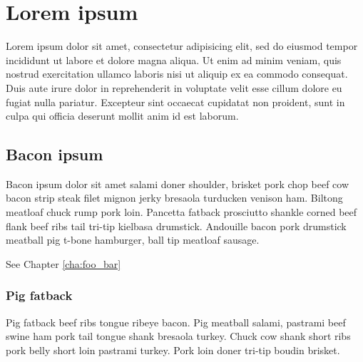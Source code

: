\chapter{Lorem ipsum}
\label{cha:lorem_ipsum}

Lorem ipsum dolor sit amet, consectetur adipisicing elit, sed do eiusmod
tempor incididunt ut labore et dolore magna aliqua. Ut enim ad minim veniam,
quis nostrud exercitation ullamco laboris nisi ut aliquip ex ea commodo
consequat. Duis aute irure dolor in reprehenderit in voluptate velit esse
cillum dolore eu fugiat nulla pariatur. Excepteur sint occaecat cupidatat non
proident, sunt in culpa qui officia deserunt mollit anim id est laborum.

\section{Bacon ipsum}
\label{sec:bacon_ipsum}

Bacon ipsum dolor sit amet salami doner shoulder, brisket pork chop beef cow bacon strip steak filet mignon jerky bresaola turducken venison ham. Biltong meatloaf chuck rump pork loin. Pancetta fatback prosciutto shankle corned beef flank beef ribs tail tri-tip kielbasa drumstick. Andouille bacon pork drumstick meatball pig t-bone hamburger, ball tip meatloaf sausage.

See Chapter \ref{cha:foo_bar}

\subsection{Pig fatback}
\label{sec:pig_fatback}

Pig fatback beef ribs tongue ribeye bacon. Pig meatball salami, pastrami beef swine ham pork tail tongue shank bresaola turkey. Chuck cow shank short ribs pork belly short loin pastrami turkey. Pork loin doner tri-tip boudin brisket.
